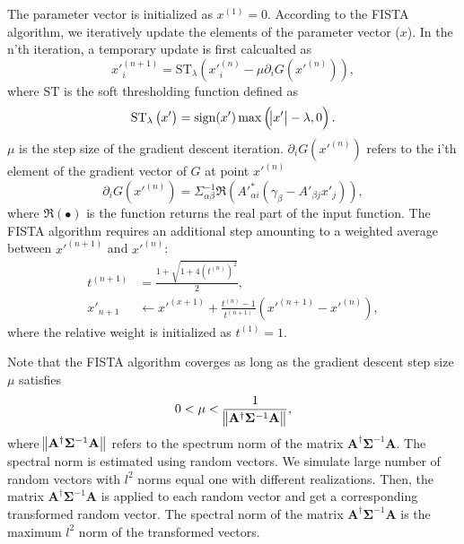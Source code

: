 \documentclass[twocolumn]{aastex62}
\begin{document}
The parameter vector is initialized as $x^{(1)}=0$. According to the FISTA algorithm, we iteratively 
update the elements of the parameter vector ($x$). In the n'th iteration, a temporary update is first calcualted as
\begin{equation}
x'^{(n+1)}_{i}=\mathrm{ST}_{\lambda} \left(x'^{(n)}_{i} -\mu \partial_i G(x'^{(n)})\right),
\end{equation}
where $\mathrm{ST}$ is the soft thresholding function defined as
\begin{equation}
\mathrm{ST}_{\lambda} \left(x'\right) = \mathrm{sign} (x') \max \left(\abs{x'}-\lambda,0\right).
\end{equation}
$\mu$ is the step size of the gradient descent iteration. 
$\partial_i G(x'^{(n)})$ refers to the i'th element of the gradient
vector of $G$ at point $x'^{(n)}$
\begin{equation}
\partial_i G(x'^{(n)})=\Sigma^{-1}_{\alpha\beta}\Re\left(A'^{*}_{\alpha i}(\gamma_{\beta}-A'_{\beta j}x'_{j})\right),
\end{equation}
where $\Re\left( \bullet \right)$ is the function returns the real part of the input function.
The FISTA algorithm requires an additional step amounting to a weighted average between
$x'^{(n+1)}$ and $x'^{(n)}$:
\begin{equation}
\begin{split}
t^{(n+1)}&=\frac{1+\sqrt{1+4(t^{(n)})^2}}{2},\\
x'_{n+1} &\leftarrow x'^{(x+1)}+ \frac{t^{(n)}-1}{t^{(n+1)}}(x'^{(n+1)}-x'^{(n)}),
\end{split}
\end{equation}
where the relative weight is initialized as $t^{(1)}=1$.

Note that the FISTA algorithm coverges as long as the gradient descent step size $\mu$ satisfies
\begin{equation}
 0< \mu < \frac{1}{ \norm{\mathbf{A^{\dagger}} \mathbf{\Sigma}^{-1} \mathbf{A} }},
\end{equation}
where $\norm{\mathbf{A^{\dagger}} \mathbf{\Sigma}^{-1} \mathbf{A} }$ refers to the spectrum norm of the matrix
$\mathbf{A^{\dagger}} \mathbf{\Sigma}^{-1} \mathbf{A}$. The spectral norm is estimated using random
vectors. We simulate large number of random vectors with $l^2$ norms equal one with different realizations. Then, 
the matrix $\mathbf{A^{\dagger}} \mathbf{\Sigma}^{-1} \mathbf{A}$ is applied to each random vector and get a 
corresponding transformed random vector. The spectral norm of the matrix $\mathbf{A^{\dagger}} \mathbf{\Sigma}^{-1} \mathbf{A}$
is the maximum $l^2$ norm of the transformed vectors.
\end{document}
